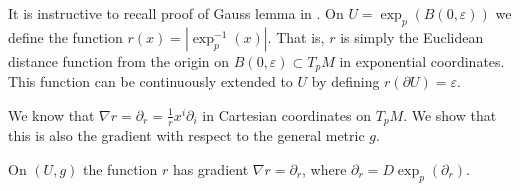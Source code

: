 It is instructive to recall proof of Gauss lemma in \cite{Petersen2016}.
On \( U = \exp _ { p } ( B ( 0 , \varepsilon ) ) \) we define the function \( r ( x ) = \left| \exp _ { p } ^ { - 1 } ( x ) \right| . \)
That is, \( r \) is simply the Euclidean distance function from the origin on \( B ( 0 , \varepsilon ) \subset T _ { p } M \) in exponential coordinates.
This function can be continuously extended to \( U \) by defining \( r ( \partial U ) = \varepsilon . \)

We know that \( \nabla r = \partial _ { r } = \frac { 1 } { r } x ^ { i } \partial _ { i } \) in Cartesian coordinates
on \( T _ { p } M . \)
We show that this is also the gradient with respect to the general metric \( g . \)

\begin{lem}
	On \( ( U , g ) \) the function \( r \) has gradient \( \nabla r = \partial _ { r } \), where \( \partial _ { r } = D \exp _ { p } \left( \partial _ { r } \right) \).
\end{lem}

